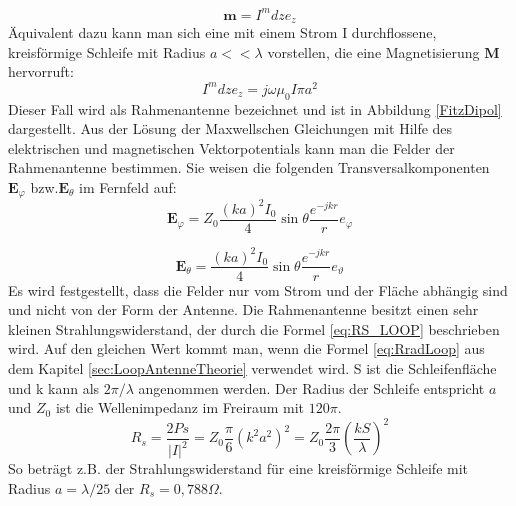 \begin{equation}
\textbf{m}=I^{m}dze_z
\end{equation}
Äquivalent dazu kann man sich eine mit einem Strom I durchflossene, kreisförmige Schleife mit Radius $a<<\lambda$ vorstellen, die eine Magnetisierung $\textbf{M}$ hervorruft:
\begin{equation}
I^{m}dze_{z}=j\omega\mu_{0}I\pi a^{2}
\end{equation}
Dieser Fall wird als Rahmenantenne bezeichnet und ist in Abbildung \ref{FitzDipol} dargestellt. Aus der Lösung der Maxwellschen Gleichungen mit Hilfe des elektrischen und
magnetischen Vektorpotentials kann man die Felder der Rahmenantenne bestimmen.
Sie weisen die folgenden Transversalkomponenten $\textbf{E}_{\varphi}$ bzw.$\textbf{E}_{\theta}$ im Fernfeld auf:
\begin{equation}
\textbf{E}_{\varphi}=Z_{0}\dfrac{(ka)^2I_{0}}{4}\sin \theta \dfrac{e^{-jkr}}{r} e_{\varphi}
\end{equation}

\begin{equation}
\textbf{E}_{\theta}=\dfrac{(ka)^2I_{0}}{4}\sin \theta \dfrac{e^{-jkr}}{r} e_{\vartheta}
\end{equation}
Es wird festgestellt, dass die Felder nur vom Strom und der Fläche abhängig sind
und nicht von der Form der Antenne. 
Die Rahmenantenne besitzt einen sehr kleinen Strahlungswiderstand, der durch die
Formel \ref{eq:RS_LOOP} beschrieben wird. Auf den gleichen Wert kommt man, wenn die Formel \ref{eq:RradLoop} aus dem Kapitel \ref{sec:LoopAntenneTheorie} verwendet wird. S ist die Schleifenfläche und k kann als $2\pi/\lambda$ angenommen werden. Der Radius der Schleife entspricht $a$ und $Z_0$ ist die Wellenimpedanz im Freiraum mit $120\pi$.
\begin{equation}\label{eq:RS_LOOP}
R_{s}=\dfrac{2Ps}{|I|^{2}}=Z_{0}\dfrac{\pi}{6}(k^{2}a^{2})^{2}=Z_{0}\dfrac{2\pi}{3}\left(\dfrac{kS}{\lambda}\right)^{2} 
\end{equation}
So beträgt z.B. der Strahlungswiderstand für eine kreisförmige Schleife mit Radius $a = \lambda/25$ der  $R_{s} = 0,788\Omega$.



